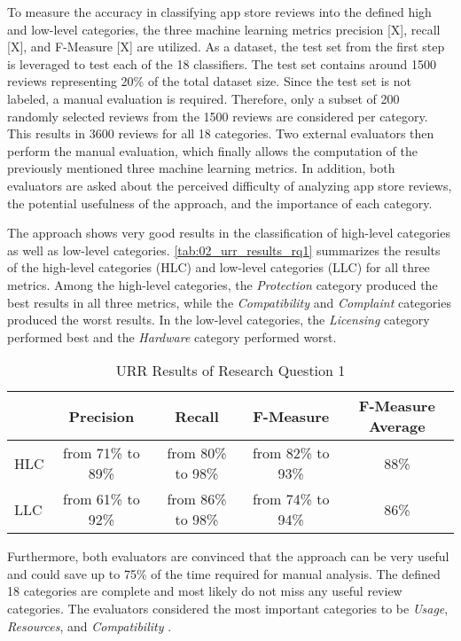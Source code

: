 To measure the accuracy in classifying app store reviews into the defined high and low-level categories, the three machine learning metrics precision [X], recall [X], and F-Measure [X] are utilized. As a dataset, the test set from the first step is leveraged to test each of the 18 classifiers. The test set contains around 1500 reviews representing 20\% of the total dataset size. 
Since the test set is not labeled, a manual evaluation is required. Therefore, only a subset of 200 randomly selected reviews from the 1500 reviews are considered per category. This results in 3600 reviews for all 18 categories. Two external evaluators then perform the manual evaluation, which finally allows the computation of the previously mentioned three machine learning metrics. In addition, both evaluators are asked about the perceived difficulty of analyzing app store reviews, the potential usefulness of the approach, and the importance of each category.

The approach shows very good results in the classification of high-level categories as well as low-level categories. \autoref{tab:02_urr_results_rq1} summarizes the results of the high-level categories (HLC) and low-level categories (LLC) for all three metrics. Among the high-level categories, the \textit{Protection} category produced the best results in all three metrics, while the \textit{Compatibility} and \textit{Complaint} categories produced the worst results. In the low-level categories, the \textit{Licensing} category performed best and the \textit{Hardware} category performed worst.

\begin{table}
    \centering
    \caption{URR Results of Research Question 1}
    \begin{tabular}{l|c|c|c|c} \hline
                &  Precision   & Recall & F-Measure & F-Measure Average \\ \hline\hline
        HLC     & from 71\% to 89\%  & from 80\% to 98\%        & from 82\% to 93\%       & 88\%           \\ \hline
        LLC     & from 61\% to 92\%  & from 86\% to 98\%        & from 74\% to 94\%    & 86\%             \\
        \hline
    \end{tabular}
    \label{tab:02_urr_results_rq1}
\end{table}

Furthermore, both evaluators are convinced that the approach can be very useful and could save up to 75\% of the time required for manual analysis. The defined 18 categories are complete and most likely do not miss any useful review categories. The evaluators considered the most important categories to be \textit{Usage}, \textit{Resources}, and \textit{Compatibility} \cite[p. 98]{Ciurumelea.2017}.

